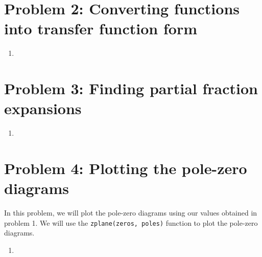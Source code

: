 \documentclass[11pt]{article}
\begin{document}
\section{Problem 2: Converting functions into transfer function form}
\begin{enumerate}[label=\textbf{\alph*)}, leftmargin=2.6em]
    \item 
\end{enumerate}


\section{Problem 3: Finding partial fraction expansions}
\begin{enumerate}[label=\textbf{\alph*)}, leftmargin=2.6em]
    \item 
\end{enumerate}


\section{Problem 4: Plotting the pole-zero diagrams}
In this problem, we will plot the pole-zero diagrams using our values obtained in problem 1.
We will use the \texttt{zplane(zeros, poles)} function to plot the pole-zero diagrams.
\begin{enumerate}[label=\textbf{\alph*)}, leftmargin=2.6em]
    \item 
\end{enumerate}
\end{document}
